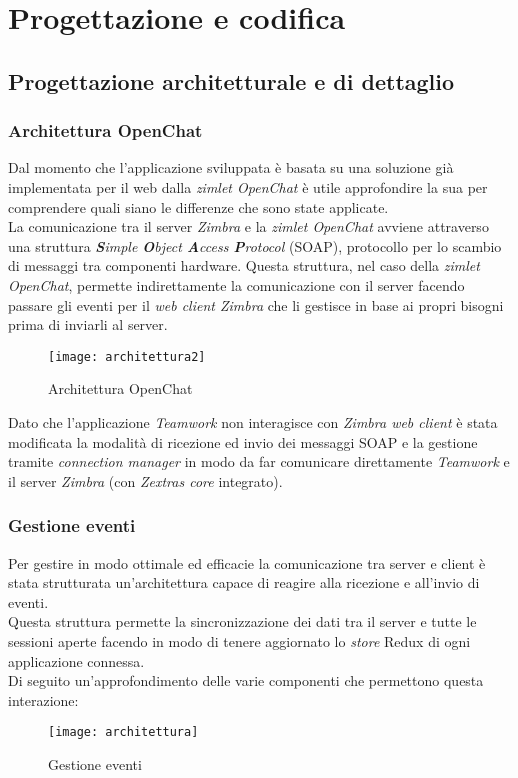 \chapter{Progettazione e codifica }\label{chap:design}

\section {Progettazione architetturale e di dettaglio}
\subsection{Architettura OpenChat}
Dal momento che l'applicazione sviluppata è basata su una soluzione già implementata per il web dalla \emph{zimlet OpenChat} è utile approfondire la sua  per comprendere quali siano le differenze che sono state applicate.\\
La comunicazione tra il server \emph{Zimbra} e la \emph{zimlet OpenChat} avviene attraverso una struttura \emph{\textbf{S}imple \textbf{O}bject \textbf{A}ccess \textbf{P}rotocol} (\acrshort{SOAP}), protocollo per lo scambio di messaggi tra componenti hardware. Questa struttura, nel caso della \emph{zimlet OpenChat}, permette indirettamente la comunicazione con il server facendo passare gli eventi per il \emph{web client Zimbra} che li gestisce in base ai propri bisogni prima di inviarli al server. \\
\begin{figure}[H] 
	\centering
	\texttt{[image: architettura2]}
	\caption{Architettura OpenChat}
\end{figure}
Dato che l'applicazione \emph{Teamwork} non interagisce con \emph{Zimbra web client} è stata modificata la modalità di ricezione ed invio dei messaggi SOAP e la gestione tramite \emph{connection manager} in modo da far comunicare direttamente \emph{Teamwork} e il server \emph{Zimbra} (con \emph{Zextras core} integrato).

\subsection{Gestione eventi}
Per gestire in modo ottimale ed efficacie la comunicazione tra server e client è stata strutturata un'architettura capace di reagire alla ricezione e all'invio di eventi. \\
Questa struttura permette la sincronizzazione dei dati tra il server e tutte le sessioni aperte facendo in modo di tenere aggiornato lo \emph{store} Redux di ogni applicazione connessa.\\
Di seguito un'approfondimento delle varie componenti che permettono questa interazione:
\begin{figure}[H] 
	\centering
	\texttt{[image: architettura]}
	\caption{Gestione eventi}
\end{figure}
